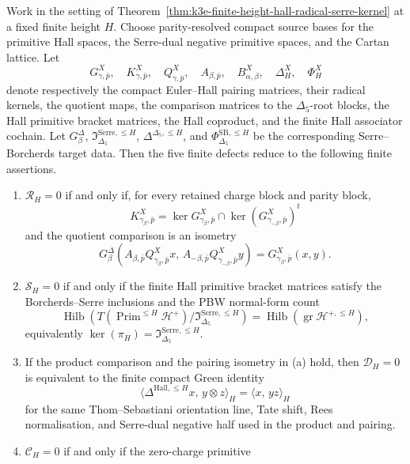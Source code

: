 \begin{theorem}
\label{thm:k3e-finite-defect-reduction}
Work in the setting of
Theorem~\ref{thm:k3e-finite-height-hall-radical-serre-kernel} at a
fixed finite height \(H\). Choose parity-resolved compact source bases
for the primitive Hall spaces, the Serre-dual negative primitive spaces,
and the Cartan lattice. Let
\[
 G^X_{\gamma,\bar p},\quad
 K^X_{\gamma,\bar p},\quad
 Q^X_{\gamma,\bar p},\quad
 A_{\beta,\bar p},\quad
 B^X_{\alpha,\beta},\quad
 \Delta^X_H,\quad
 \Phi^X_H
\]
denote respectively the compact Euler--Hall pairing matrices, their
radical kernels, the quotient maps, the comparison matrices to the
\(\Delta_5\)-root blocks, the Hall primitive bracket matrices, the Hall
coproduct, and the finite Hall associator cochain. Let \(G^\Delta_\beta\),
\(\mathfrak I^{\mathrm{Serre},\leq H}_{\Delta_5}\),
\(\Delta^{\Delta_5,\leq H}\), and
\(\Phi^{\mathrm{SB},\leq H}_{\Delta_5}\) be the corresponding
Serre--Borcherds target data. Then the five finite defects reduce to the
following finite assertions.
\begin{enumerate}[label=\textup{(\alph*)}]
\item \(\mathcal R_H=0\) if and only if, for every retained charge
block and parity block,
\[
 K^X_{\gamma_\beta,\bar p}
 =
 \ker G^X_{\gamma_\beta,\bar p}
 \cap
 \ker (G^X_{\gamma_{-\beta},\bar p})^t
\]
and the quotient comparison is an isometry
\[
 G^\Delta_\beta\!\left(
 A_{\beta,\bar p}Q^X_{\gamma_\beta,\bar p}x,\,
 A_{-\beta,\bar p}Q^X_{\gamma_{-\beta},\bar p}y
 \right)
 =
 G^X_{\gamma_\beta,\bar p}(x,y).
\]
\item \(\mathcal S_H=0\) if and only if the finite Hall primitive
bracket matrices satisfy the Borcherds--Serre inclusions and the PBW
normal-form count
\[
 \operatorname{Hilb}\!
 \left(
 T(\operatorname{Prim}^{\leq H}\mathcal H^+)/
 \mathfrak I^{\mathrm{Serre},\leq H}_{\Delta_5}
 \right)
 =
 \operatorname{Hilb}\!
 \left(\operatorname{gr}\mathcal H^{+,\leq H}\right),
\]
equivalently
\(\ker(\pi_H)=\mathfrak I^{\mathrm{Serre},\leq H}_{\Delta_5}\).
\item If the product comparison and the pairing isometry in
\textup{(a)} hold, then \(\mathcal D_H=0\) is equivalent to the finite
compact Green identity
\[
 \langle \Delta^{\mathrm{Hall},\leq H}x,\,
 y\otimes z\rangle_H
 =
 \langle x,\, yz\rangle_H
\]
for the same Thom--Sebastiani orientation line, Tate shift, Rees
normalisation, and Serre-dual negative half used in the product and
pairing.
\item \(\mathcal C_H=0\) if and only if the zero-charge primitive

\end{enumerate}
\end{theorem}
